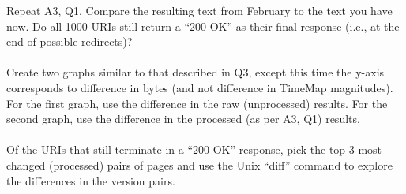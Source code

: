 Repeat A3, Q1.  Compare the resulting text from February to 
the text you have now.  Do all 1000 URIs still return a \enquote{200 OK}
as their final response (i.e., at the end of possible redirects)?\\
\\
Create two graphs similar to that described in Q3, except this 
time the y-axis corresponds to difference in bytes (and not difference
in TimeMap magnitudes).  For the first graph, use the difference
in the raw (unprocessed) results.  For the second graph, use the 
difference in the processed (as per A3, Q1) results.\\
\\
Of the URIs that still terminate in a \enquote{200 OK} response, pick the
top 3 most changed (processed) pairs of pages and use the Unix
\enquote{diff} command to explore the differences in the version pairs.